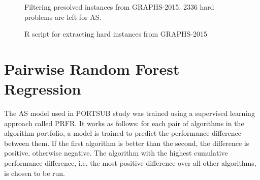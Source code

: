 \begin{figure}[H]
	\centering
	\caption[Filtering presolved instances from GRAPHS-2015]{Filtering presolved instances from GRAPHS-2015. 2336 hard problems are left for AS.}
	\label{fig:presolver}
\end{figure}

\begin{figure}[H]
	\centering
	\caption{R script for extracting hard instances from GRAPHS-2015}
	\label{fig:extracthard}
\end{figure}

\section{Pairwise Random Forest Regression}
The AS model used in PORTSUB study was trained using a supervised learning approach called PRFR. It works as follows: for each pair of algorithms in the algorithm portfolio, a model is trained to predict the performance difference between them. If the first algorithm is better than the second, the difference is positive, otherwise negative. The algorithm with the highest cumulative performance difference, i.e. the most positive difference over all other algorithms, is chosen to be run. 


